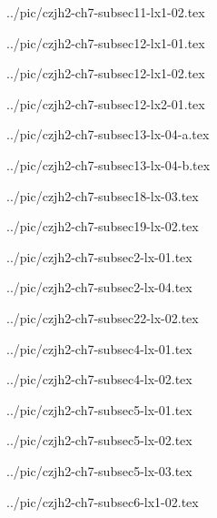 ../pic/czjh2-ch7-subsec11-lx1-02.tex



../pic/czjh2-ch7-subsec12-lx1-01.tex



../pic/czjh2-ch7-subsec12-lx1-02.tex



../pic/czjh2-ch7-subsec12-lx2-01.tex



../pic/czjh2-ch7-subsec13-lx-04-a.tex



../pic/czjh2-ch7-subsec13-lx-04-b.tex



../pic/czjh2-ch7-subsec18-lx-03.tex



../pic/czjh2-ch7-subsec19-lx-02.tex



../pic/czjh2-ch7-subsec2-lx-01.tex



../pic/czjh2-ch7-subsec2-lx-04.tex



../pic/czjh2-ch7-subsec22-lx-02.tex



../pic/czjh2-ch7-subsec4-lx-01.tex



../pic/czjh2-ch7-subsec4-lx-02.tex



../pic/czjh2-ch7-subsec5-lx-01.tex



../pic/czjh2-ch7-subsec5-lx-02.tex



../pic/czjh2-ch7-subsec5-lx-03.tex



../pic/czjh2-ch7-subsec6-lx1-02.tex

